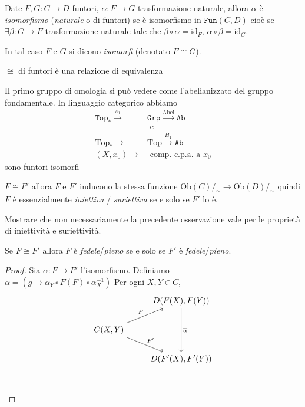 \begin{definition}{}
    Date \(F, G : C \to D\) funtori, \(\alpha : F \to G\) trasformazione
    naturale, allora \(\alpha\) è \emph{isomorfismo} (\emph{naturale} o di funtori) se è isomorfismo in \(\mathtt{Fun}{(C, D)}\) cioè se 
    \(\exists \beta : G \to F\) trasformazione naturale tale che \(\beta \circ
    \alpha = \mathrm{id}_F\), \(\alpha \circ \beta = \mathrm{id}_G\).

    In tal caso \(F\) e \(G\) si dicono \emph{isomorfi} (denotato \(F \cong
    G\)).
\end{definition}
\begin{remark}{}
    \(\cong\) di funtori è una relazione di equivalenza 
\end{remark}
\begin{example}{}

Il primo gruppo di omologia si può vedere come l'abelianizzato del gruppo
fondamentale. In linguaggio categorico abbiamo 
\begin{align*}
  \mathtt{Top_*} \overset{\pi_{1}}{\to } &\mathtt{Grp} \overset{\mathrm{Abel}}{\to } \mathtt{Ab} \\ 
  &\text{ e } \\
  \mathrm{Top_*} \to &\mathrm{Top} \overset{H_{1}}{\to } \mathtt{Ab} \\
  {(X, x_{0})} \mapsto &\text{ comp. c.p.a. a \(x_{0}\)}
\end{align*}
sono funtori isomorfi
\end{example}

\begin{remark}{}
    \(F \cong F'\) allora \(F\) e \(F'\) inducono la stessa funzione \(\mathrm{Ob}{(C)} /_{\cong} \to \mathrm{Ob}{(D)}/_{\cong}\) quindi \(F\) è essenzialmente 
   \emph{iniettiva} / \emph{suriettiva} se e solo se \(F'\) lo è.
\end{remark}

\begin{eser}{}
    Mostrare che non necessariamente la precedente osservazione vale per le
    proprietà di iniettività e suriettività.
\end{eser}

\begin{proposition}{}
    Se \(F \cong F'\) allora \(F\) è \emph{fedele}/\emph{pieno} se e solo se \(F'\) è \emph{fedele}/\emph{pieno}.
\end{proposition}
\begin{proof}{}
    Sia \(\alpha : F \to F'\) l'isomorfismo. Definiamo \\\(\overline{\alpha} = {(g \mapsto \alpha_Y \circ F{(F)} \circ \alpha_X^{-1})}\) 
    Per ogni \(X, Y \in C\),
\[\begin{tikzcd}
	& {D(F(X),F(Y))} \\
	{C(X,Y)} \\
	& {D(F'(X),F'(Y))} \\
	\arrow["{\overline{\alpha}}", from=1-2, to=3-2]
	\arrow["F", from=2-1, to=1-2]
	\arrow["{F'}", from=2-1, to=3-2]
\end{tikzcd}\]
\end{proof}

